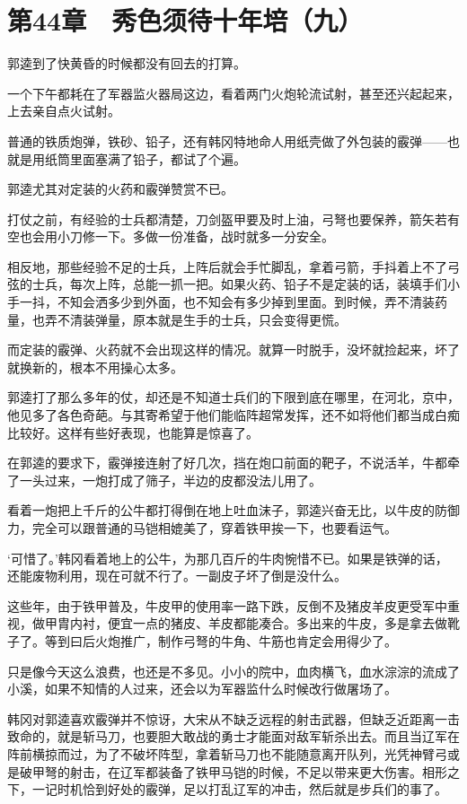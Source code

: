 \section{第44章　秀色须待十年培（九）}

郭逵到了快黄昏的时候都没有回去的打算。

一个下午都耗在了军器监火器局这边，看着两门火炮轮流试射，甚至还兴起起来，上去亲自点火试射。

普通的铁质炮弹，铁砂、铅子，还有韩冈特地命人用纸壳做了外包装的霰弹——也就是用纸筒里面塞满了铅子，都试了个遍。

郭逵尤其对定装的火药和霰弹赞赏不已。

打仗之前，有经验的士兵都清楚，刀剑盔甲要及时上油，弓弩也要保养，箭矢若有空也会用小刀修一下。多做一份准备，战时就多一分安全。

相反地，那些经验不足的士兵，上阵后就会手忙脚乱，拿着弓箭，手抖着上不了弓弦的士兵，每次上阵，总能一抓一把。如果火药、铅子不是定装的话，装填手们小手一抖，不知会洒多少到外面，也不知会有多少掉到里面。到时候，弄不清装药量，也弄不清装弹量，原本就是生手的士兵，只会变得更慌。

而定装的霰弹、火药就不会出现这样的情况。就算一时脱手，没坏就捡起来，坏了就换新的，根本不用操心太多。

郭逵打了那么多年的仗，却还是不知道士兵们的下限到底在哪里，在河北，京中，他见多了各色奇葩。与其寄希望于他们能临阵超常发挥，还不如将他们都当成白痴比较好。这样有些好表现，也能算是惊喜了。

在郭逵的要求下，霰弹接连射了好几次，挡在炮口前面的靶子，不说活羊，牛都牵了一头过来，一炮打成了筛子，半边的皮都没法儿用了。

看着一炮把上千斤的公牛都打得倒在地上吐血沫子，郭逵兴奋无比，以牛皮的防御力，完全可以跟普通的马铠相媲美了，穿着铁甲挨一下，也要看运气。

‘可惜了。’韩冈看着地上的公牛，为那几百斤的牛肉惋惜不已。如果是铁弹的话，还能废物利用，现在可就不行了。一副皮子坏了倒是没什么。

这些年，由于铁甲普及，牛皮甲的使用率一路下跌，反倒不及猪皮羊皮更受军中重视，做甲胄内衬，便宜一点的猪皮、羊皮都能凑合。多出来的牛皮，多是拿去做靴子了。等到曰后火炮推广，制作弓弩的牛角、牛筋也肯定会用得少了。

只是像今天这么浪费，也还是不多见。小小的院中，血肉横飞，血水淙淙的流成了小溪，如果不知情的人过来，还会以为军器监什么时候改行做屠场了。

韩冈对郭逵喜欢霰弹并不惊讶，大宋从不缺乏远程的射击武器，但缺乏近距离一击致命的，就是斩马刀，也要胆大敢战的勇士才能面对敌军斩杀出去。而且当辽军在阵前横掠而过，为了不破坏阵型，拿着斩马刀也不能随意离开队列，光凭神臂弓或是破甲弩的射击，在辽军都装备了铁甲马铠的时候，不足以带来更大伤害。相形之下，一记时机恰到好处的霰弹，足以打乱辽军的冲击，然后就是步兵们的事了。

